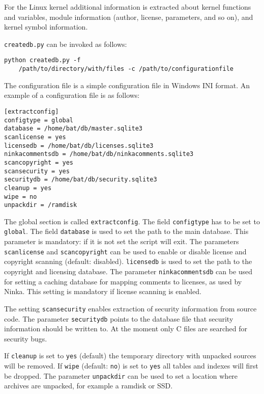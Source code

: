 \documentclass[10pt]{article}
\begin{document}
For the Linux kernel additional information is extracted about kernel functions
and variables, module information (author, license, parameters, and so on),
and kernel symbol information.

\texttt{createdb.py} can be invoked as follows:

\begin{verbatim}
python createdb.py -f
    /path/to/directory/with/files -c /path/to/configurationfile
\end{verbatim}

The configuration file is a simple configuration file in Windows INI format. An
example of a configuration file is as follows:

\begin{verbatim}
[extractconfig]
configtype = global
database = /home/bat/db/master.sqlite3
scanlicense = yes
licensedb = /home/bat/db/licenses.sqlite3
ninkacommentsdb = /home/bat/db/ninkacomments.sqlite3
scancopyright = yes
scansecurity = yes
securitydb = /home/bat/db/security.sqlite3
cleanup = yes
wipe = no
unpackdir = /ramdisk
\end{verbatim}

The global section is called \texttt{extractconfig}. The field
\texttt{configtype} has to be set to \texttt{global}. The field
\texttt{database} is used to set the path to the main database. This parameter
is mandatory: if it is not set the script will exit. The parameters
\texttt{scanlicense} and \texttt{scancopyright} can be used to enable or
disable license and copyright scanning (default: disabled). \texttt{licensedb}
is used to set the path to the copyright and licensing database. The parameter
\texttt{ninkacommentsdb} can be used for setting a caching database for mapping
comments to licenses, as used by Ninka. This setting is mandatory if license
scanning is enabled.

The setting \texttt{scansecurity} enables extraction of security information
from source code. The parameter \texttt{securitydb} points to the database file
that security information should be written to. At the moment only C files are
searched for security bugs.

If \texttt{cleanup} is set to \texttt{yes} (default) the temporary directory
with unpacked sources will be removed. If \texttt{wipe} (default: \texttt{no})
is set to \texttt{yes} all tables and indexes will first be dropped. The
parameter \texttt{unpackdir} can be used to set a location where archives are
unpacked, for example a ramdisk or SSD.
\end{document}
